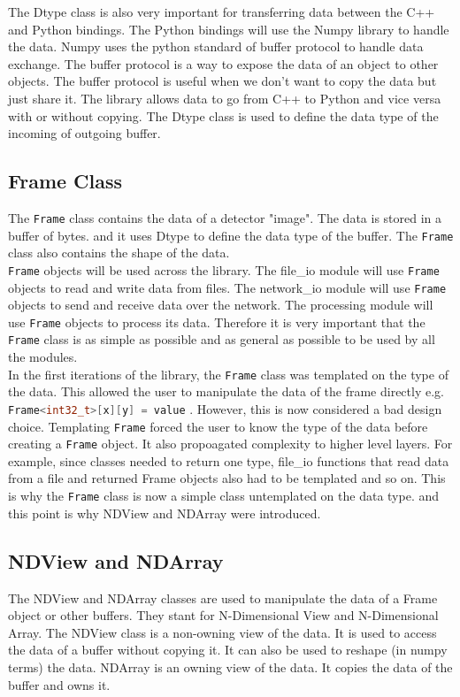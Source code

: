 \documentclass[./chapitre3.tex]{subfiles}
\begin{document}
The Dtype class is also very important for transferring data between the C++ and Python bindings.
The Python bindings will use the Numpy library to handle the data. Numpy uses the python standard
of buffer protocol\cite{bufferprotocol} to handle data exchange. The buffer protocol is a way to expose the data of an object
to other objects. The buffer protocol is useful when we don't want to copy the data but just share it.
The library allows data to go from C++ to Python and vice versa with or without copying.
The Dtype class is used to define the data type of the incoming of outgoing buffer.\\

\subsection{Frame Class}
The \lstinline|Frame| class contains the data of a detector "image". The data is stored in a buffer of bytes.
and it uses Dtype to define the data type of the buffer. The \lstinline|Frame| class also contains the shape
of the data.\\

\lstinline|Frame| objects will be used across the library. The file\_io module will use \lstinline|Frame| objects to read
and write data from files. The network\_io module will use \lstinline|Frame| objects to send and receive data
over the network. The processing module will use \lstinline|Frame| objects to process its data. Therefore
it is very important that the \lstinline|Frame| class is as simple as possible and as general as possible
to be used by all the modules.\\

In the first iterations of the library, the \lstinline|Frame| class was templated on the type of the data.
This allowed the user to manipulate the data of the frame directly e.g. \lstinline[language=C++]|Frame<int32_t>[x][y] = value| .
However, this is now considered a bad design choice. Templating \lstinline|Frame| forced the user to know the type
of the data before creating a \lstinline|Frame| object. It also propoagated complexity to higher level
layers. For example, since classes needed to return one type, file\_io functions that read data from a file and returned
Frame objects also had to be templated and so on. This is why the \lstinline|Frame| class is now a simple class untemplated
on the data type. and this point is why NDView and NDArray were introduced.

\subsection{NDView and NDArray}
The NDView and NDArray classes are used to manipulate the data of a Frame object or other buffers. They stant for
N-Dimensional View and N-Dimensional Array. The NDView class is a non-owning view of the data. It is used to access
the data of a buffer without copying it. It can also be used to reshape (in numpy terms) the data. NDArray is an
owning view of the data. It copies the data of the buffer and owns it.\\
\end{document}
